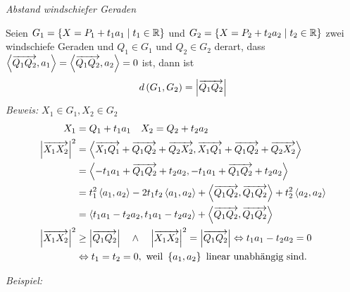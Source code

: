 \begin{mylemma}\textit{Abstand windschiefer Geraden}\medskip

    Seien $G_1 = \left\{ X = P_1 + t_1 a_1 \mid t_1 \in \mathbb{R} \right\}$ und $G_2 = \left\{ X = P_2 + t_2 a_2 \mid t_2 \in \mathbb{R} \right\}$ zwei windschiefe Geraden und $Q_1 \in G_1$ und $Q_2 \in G_2$ derart, 
    dass $\left\langle \overrightarrow{Q_1 Q_2}, a_1 \right\rangle = \left\langle \overrightarrow{Q_1 Q_2}, a_2 \right\rangle = 0$ ist, dann ist
    \begin{align*}
        d\left( G_1, G_2 \right) = \left| \overrightarrow{Q_1 Q_2} \right|
    \end{align*}
    \textit{Beweis:} $X_1 \in G_1, X_2 \in G_2$
    \begin{align*}
        X_1 & = Q_1 + t_1 a_1 \quad X_2 = Q_2 + t_2 a_2\\
        \left| \overrightarrow{X_1 X_2} \right|^{2} & = \left\langle \overrightarrow{X_1 Q_1} + \overrightarrow{Q_1 Q_2} + \overrightarrow{Q_2 X_2}, \overrightarrow{X_1 Q_1} + \overrightarrow{Q_1 Q_2} + \overrightarrow{Q_2 X_2} \right\rangle\\
        & = \left\langle - t_1 a_1 + \overrightarrow{Q_1 Q_2} + t_2 a_2, - t_1 a_1 + \overrightarrow{Q_1 Q_2} + t_2 a_2 \right\rangle\\
        & = t_1^2 \left\langle a_1, a_2 \right\rangle - 2 t_1 t_2 \left\langle a_1, a_2 \right\rangle + \left\langle \overrightarrow{Q_1 Q_2}, \overrightarrow{Q_1 Q_2} \right\rangle + t_2^2 \left\langle a_2, a_2 \right\rangle\\
        & = \left\langle t_1 a_1 - t_2 a_2, t_1 a_1 - t_2 a_2 \right\rangle + \left\langle \overrightarrow{Q_1 Q_2}, \overrightarrow{Q_1 Q_2} \right\rangle\\
        \left| \overrightarrow{X_1 X_2} \right|^{2} & \geq \left| \overrightarrow{Q_1 Q_2} \right| \quad \wedge \quad \left| \overrightarrow{X_1 X_2} \right|^{2} = \left| \overrightarrow{Q_1 Q_2} \right| \Leftrightarrow t_1 a_1 - t_2 a_2 = 0\\
        & \Leftrightarrow t_1 = t_2 = 0, \text{ weil } \left\{ a_1, a_2 \right\} \text{ linear unabhängig sind.}
    \end{align*}
\end{mylemma}

\textit{Beispiel:}\medskip

